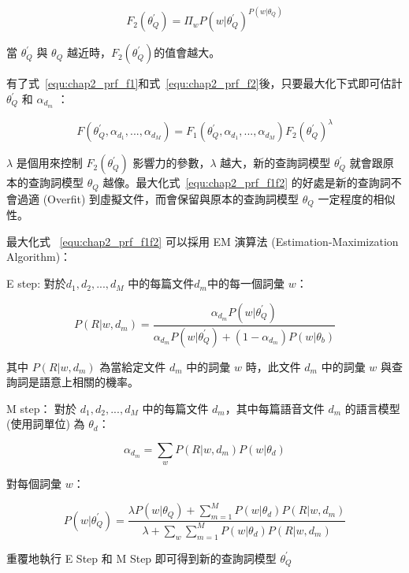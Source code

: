 \begin{equation}
\label{equ:chap2_prf_f2}
F_2(\theta_Q^{'}) = \Pi_w P(w|\theta_Q^{'})^{P(w|\theta_Q)}
\end{equation}

當 $\theta_Q^{'}$ 與 $\theta_Q$ 越近時，$F_2(\theta_Q^{'})$的值會越大。

有了式~\ref{equ:chap2_prf_f1}和式~\ref{equ:chap2_prf_f2}後，只要最大化下式即可估計 $\theta_Q^{'}$ 和 $\alpha_{d_m}$ ：

\begin{equation}
\label{equ:chap2_prf_f1f2}
F(\theta_Q^{'}, \alpha_{d_1}, ..., \alpha_{d_M}) = F_1(\theta_Q^{'}, \alpha_{d_1}, ..., \alpha_{d_M}) F_2(\theta_Q^{'})^\lambda
\end{equation}

$\lambda$ 是個用來控制 $F_2(\theta_Q^{'})$ 影響力的參數，$\lambda$ 越大，新的查詢詞模型 $\theta_Q^{'}$ 就會跟原本的查詢詞模型 $\theta_Q$ 越像。最大化式~\ref{equ:chap2_prf_f1f2} 的好處是新的查詢詞不會過適 (Overfit) 到虛擬文件，而會保留與原本的查詢詞模型 $\theta_Q$ 一定程度的相似性。	

最大化式 ~\ref{equ:chap2_prf_f1f2} 可以採用 EM 演算法 (Estimation-Maximization Algorithm)：

E step: 對於${d_1, d_2, ..., d_M}$ 中的每篇文件$d_m$中的每一個詞彙 $w$：

\begin{equation}
\label{equ:chap2_prf_estep}
P(R|w, d_m) = \frac{\alpha_{d_m} P(w|\theta_Q^{'})}{\alpha_{d_m} P(w|\theta_Q^{'}) + (1-\alpha_{d_m}) P(w|\theta_b)}
\end{equation}

其中 $P(R|w, d_m)$ 為當給定文件 $d_m$ 中的詞彙 $w$ 時，此文件 $d_m$ 中的詞彙 $w$ 與查詢詞是語意上相關的機率。 

M step： 對於 ${d_1, d_2, ..., d_M}$ 中的每篇文件 $d_m$，其中每篇語音文件 $d_m$ 的語言模型 (使用詞單位) 為 $\theta_d$：

\begin{equation}
\label{equ:chap2_prf_mstep}
\alpha_{d_m} = \sum_w P(R|w, d_m)P(w|\theta_d)
\end{equation}

對每個詞彙 $w$：

\begin{equation}
P(w|\theta_Q^{'}) = \frac{\lambda P(w|\theta_Q)+\sum^M_{m=1} P(w|\theta_d) P(R|w, d_m)}{\lambda + \sum_w \sum^M_{m=1} P(w|\theta_d) P(R|w, d_m)}
\end{equation}

重覆地執行 E Step 和 M Step 即可得到新的查詢詞模型 $\theta_Q^{'}$

